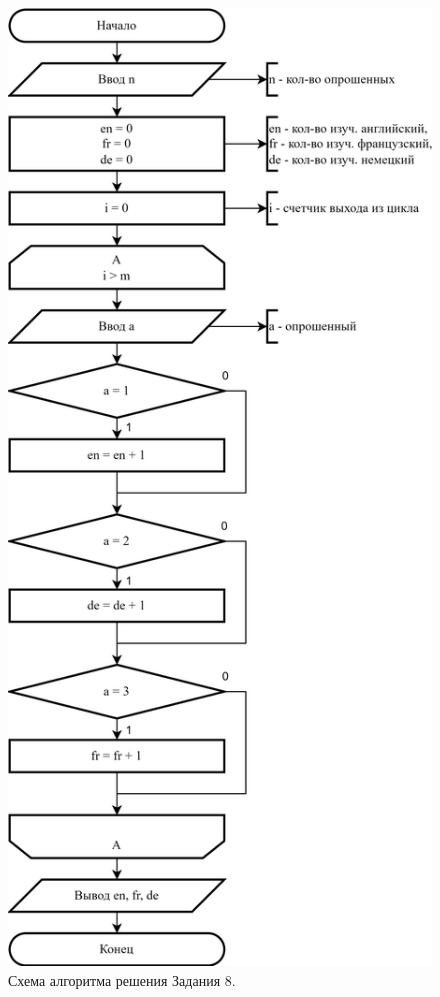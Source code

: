 \documentclass[oneside,a4paper,14pt]{extarticle}
\begin{document}
\begin{figure}
	\centering
	\includegraphics[height=0.9\textheight]{img/8-scheme.png} %
	\caption{Схема алгоритма решения Задания 8.} %
\end{figure}
\end{document}

